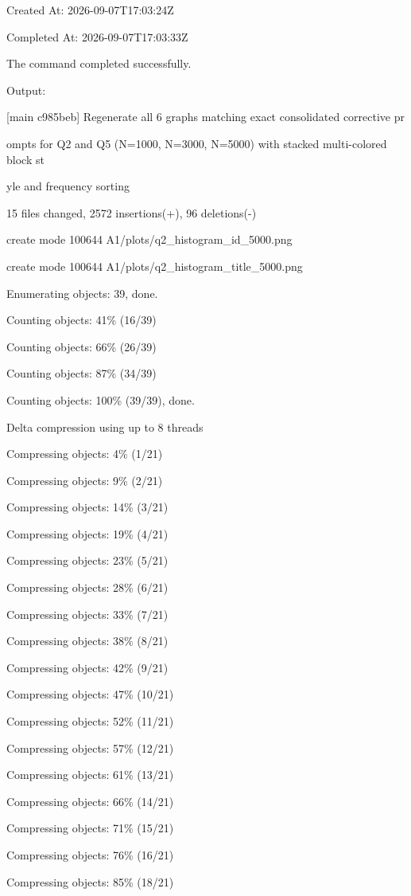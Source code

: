 \documentclass[11pt,a4paper]{article}
\begin{document}
Created At: 2026-09-07T17:03:24Z

Completed At: 2026-09-07T17:03:33Z


The command completed successfully.

Output:

[main c985beb] Regenerate all 6 graphs matching exact consolidated corrective pr

ompts for Q2 and Q5 (N=1000, N=3000, N=5000) with stacked multi-colored block st

yle and frequency sorting

15 files changed, 2572 insertions(+), 96 deletions(-)

create mode 100644 A1/plots/q2\_histogram\_id\_5000.png

create mode 100644 A1/plots/q2\_histogram\_title\_5000.png

Enumerating objects: 39, done.

Counting objects:  41\% (16/39)

Counting objects:  66\% (26/39)

Counting objects:  87\% (34/39)

Counting objects: 100\% (39/39), done.

Delta compression using up to 8 threads

Compressing objects:   4\% (1/21)

Compressing objects:   9\% (2/21)

Compressing objects:  14\% (3/21)

Compressing objects:  19\% (4/21)

Compressing objects:  23\% (5/21)

Compressing objects:  28\% (6/21)

Compressing objects:  33\% (7/21)

Compressing objects:  38\% (8/21)

Compressing objects:  42\% (9/21)

Compressing objects:  47\% (10/21)

Compressing objects:  52\% (11/21)

Compressing objects:  57\% (12/21)

Compressing objects:  61\% (13/21)

Compressing objects:  66\% (14/21)

Compressing objects:  71\% (15/21)

Compressing objects:  76\% (16/21)

Compressing objects:  85\% (18/21)
\end{document}
